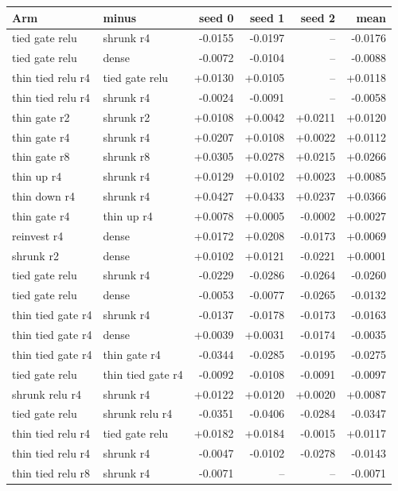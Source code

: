 \begin{tabular}{llrrrr}
\toprule
Arm & minus & seed 0 & seed 1 & seed 2 & mean \\
\midrule
tied gate relu & shrunk r4 & -0.0155 & -0.0197 & -- & -0.0176 \\
tied gate relu & dense & -0.0072 & -0.0104 & -- & -0.0088 \\
thin tied relu r4 & tied gate relu & +0.0130 & +0.0105 & -- & +0.0118 \\
thin tied relu r4 & shrunk r4 & -0.0024 & -0.0091 & -- & -0.0058 \\
thin gate r2 & shrunk r2 & +0.0108 & +0.0042 & +0.0211 & +0.0120 \\
thin gate r4 & shrunk r4 & +0.0207 & +0.0108 & +0.0022 & +0.0112 \\
thin gate r8 & shrunk r8 & +0.0305 & +0.0278 & +0.0215 & +0.0266 \\
thin up r4 & shrunk r4 & +0.0129 & +0.0102 & +0.0023 & +0.0085 \\
thin down r4 & shrunk r4 & +0.0427 & +0.0433 & +0.0237 & +0.0366 \\
thin gate r4 & thin up r4 & +0.0078 & +0.0005 & -0.0002 & +0.0027 \\
reinvest r4 & dense & +0.0172 & +0.0208 & -0.0173 & +0.0069 \\
shrunk r2 & dense & +0.0102 & +0.0121 & -0.0221 & +0.0001 \\
tied gate relu & shrunk r4 & -0.0229 & -0.0286 & -0.0264 & -0.0260 \\
tied gate relu & dense & -0.0053 & -0.0077 & -0.0265 & -0.0132 \\
thin tied gate r4 & shrunk r4 & -0.0137 & -0.0178 & -0.0173 & -0.0163 \\
thin tied gate r4 & dense & +0.0039 & +0.0031 & -0.0174 & -0.0035 \\
thin tied gate r4 & thin gate r4 & -0.0344 & -0.0285 & -0.0195 & -0.0275 \\
tied gate relu & thin tied gate r4 & -0.0092 & -0.0108 & -0.0091 & -0.0097 \\
shrunk relu r4 & shrunk r4 & +0.0122 & +0.0120 & +0.0020 & +0.0087 \\
tied gate relu & shrunk relu r4 & -0.0351 & -0.0406 & -0.0284 & -0.0347 \\
thin tied relu r4 & tied gate relu & +0.0182 & +0.0184 & -0.0015 & +0.0117 \\
thin tied relu r4 & shrunk r4 & -0.0047 & -0.0102 & -0.0278 & -0.0143 \\
thin tied relu r8 & shrunk r4 & -0.0071 & -- & -- & -0.0071 \\

\end{tabular}
